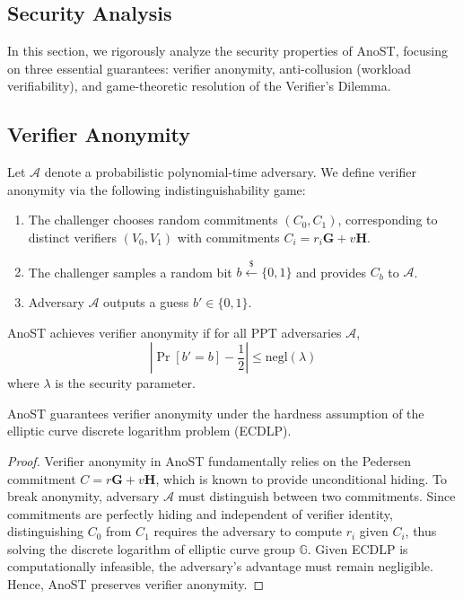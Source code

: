 \documentclass[runningheads]{llncs}
\begin{document}
\begin{CJK*}{UTF8}{gbsn}
\section{Security Analysis}
In this section, we rigorously analyze the security properties of AnoST, focusing on three essential guarantees: verifier anonymity, anti-collusion (workload verifiability), and game-theoretic resolution of the Verifier's Dilemma.

\subsection{Verifier Anonymity}
\begin{definition}
Let $\mathcal{A}$ denote a probabilistic polynomial-time adversary. We define verifier anonymity via the following indistinguishability game:
\begin{enumerate}
    \item The challenger chooses random commitments $(C_0, C_1)$, corresponding to distinct verifiers $(V_0,V_1)$ with commitments $C_i = r_i \mathbf{G} + v \mathbf{H}$.
    \item The challenger samples a random bit $b \xleftarrow{\$} \{0,1\}$ and provides $C_b$ to $\mathcal{A}$.
    \item Adversary $\mathcal{A}$ outputs a guess $b' \in \{0,1\}$.
\end{enumerate}
AnoST achieves verifier anonymity if for all PPT adversaries $\mathcal{A}$,
\[
\left| \Pr[b' = b] - \frac{1}{2} \right| \leq \text{negl}(\lambda)
\]
where $\lambda$ is the security parameter.
\end{definition}

\begin{theorem}
AnoST guarantees verifier anonymity under the hardness assumption of the elliptic curve discrete logarithm problem (ECDLP).
\end{theorem}

\begin{proof}
Verifier anonymity in AnoST fundamentally relies on the Pedersen commitment $C = r\mathbf{G} + v \mathbf{H}$, which is known to provide unconditional hiding. To break anonymity, adversary $\mathcal{A}$ must distinguish between two commitments. Since commitments are perfectly hiding and independent of verifier identity, distinguishing $C_0$ from $C_1$ requires the adversary to compute $r_i$ given $C_i$, thus solving the discrete logarithm of elliptic curve group $\mathbb{G}$. Given ECDLP is computationally infeasible, the adversary's advantage must remain negligible. Hence, AnoST preserves verifier anonymity.
\end{proof}


\end{CJK*}
\end{document}
